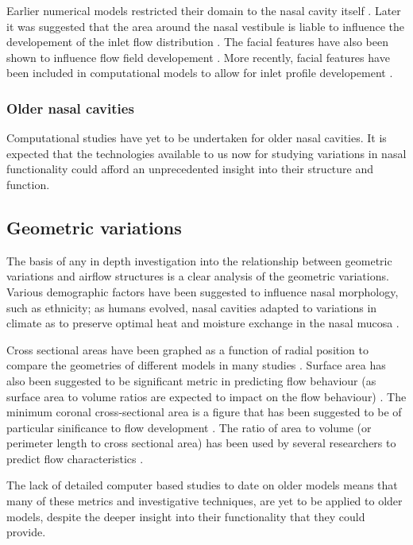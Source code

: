 Earlier numerical models restricted their domain to the nasal cavity itself \cite{Keyhani1995, Subramaniam1998, Wen2008}. Later it was suggested that the area around the nasal vestibule is liable to influence the developement of the inlet flow distribution \cite{Doorly2008}. The facial features have also been shown to influence flow field developement \cite{Anthony2005}. More recently, facial features have been included in computational models to allow for inlet profile developement \cite{Li2012, Lee2010}.


\subsubsection*{Older nasal cavities}
Computational studies have yet to be undertaken for older nasal cavities. It is expected that the technologies available to us now for studying variations in nasal functionality could afford an unprecedented insight into their structure and function.

\subsection{Geometric variations}
The basis of any in depth investigation into the relationship between geometric variations and airflow structures is a clear analysis of the geometric variations. Various demographic factors have been suggested to influence nasal morphology, such as ethnicity; as humans evolved, nasal cavities adapted to variations in climate as to preserve optimal heat and moisture exchange in the nasal mucosa \cite{Davies1932, Thomson1923, Weiner1954, Churchill2004, Noback2011}.

Cross sectional areas have been graphed as a function of radial position to compare the geometries of different models in many studies \cite{Xi2012, Zhu2011, Lindemann2008, Garcia2007}. Surface area has also been suggested to be significant metric in predicting flow behaviour (as surface area to volume ratios are expected to impact on the flow behaviour) \cite{Xi2012, Garcia2007}. The minimum coronal cross-sectional area is a figure that has been suggested to be of particular sinificance to flow development \cite{Lindemann2008}. The ratio of area to volume (or perimeter length to cross sectional area) has been used by several researchers to predict flow characteristics \cite{Xi2012, Garcia2007}.

The lack of detailed computer based studies to date on older models means that many of these metrics and investigative techniques, are yet to be applied to older models, despite the deeper insight into their functionality that they could provide.

